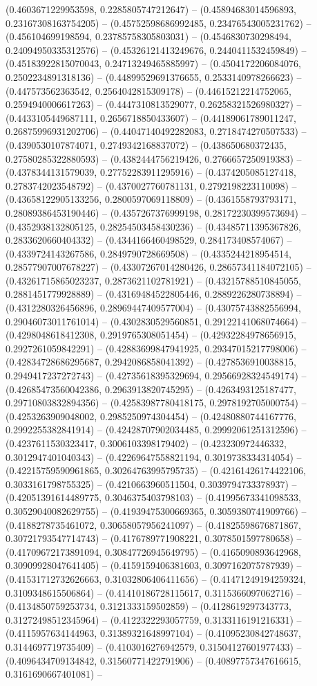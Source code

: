 (0.4603671229953598, 0.2285805747212647) -- (0.45894683014596893, 0.23167308163754205) -- (0.45752598686992485, 0.23476543005231762) -- (0.456104699198594, 0.23785758305803031) -- (0.4546830730298494, 0.24094950335312576) -- (0.45326121413249676, 0.2440411532459849) -- (0.45183922815070043, 0.24713249465885997) -- (0.4504172206084076, 0.2502234891318136) -- (0.44899529691376655, 0.2533140978266623) -- (0.447573562363542, 0.2564042815309178) -- (0.44615212214752065, 0.2594940006617263) -- (0.4447310813529077, 0.26258321526980327) -- (0.4433105449687111, 0.2656718850433607) -- (0.44189061789011247, 0.26875996931202706) -- (0.44047140492282083, 0.2718474270507533) -- (0.4390530107874071, 0.2749342168837072) -- (0.438650680372435, 0.27580285322880593) -- (0.4382444756219426, 0.2766657250919383) -- (0.4378344131579039, 0.27752283911295916) -- (0.4374205085127418, 0.2783742023548792) -- (0.4370027760781131, 0.2792198223110098) -- (0.43658122905133256, 0.2800597069118809) -- (0.4361558793793171, 0.28089386453190446) -- (0.4357267376999198, 0.28172230399573694) -- (0.4352938132805125, 0.28254503458430236) -- (0.43485711395367826, 0.2833620660404332) -- (0.4344166460498529, 0.284173408574067) -- (0.4339724143267586, 0.2849790728669508) -- (0.4335244218954514, 0.28577907007678227) -- (0.43307267014280426, 0.28657341184072105) -- (0.43261715865023237, 0.2873621102781921) -- (0.43215788510845055, 0.2881451779928889) -- (0.43169484522805446, 0.2889226280738894) -- (0.4312280326456896, 0.28969447409577004) -- (0.43075743882556994, 0.29046073011761014) -- (0.4302830529560851, 0.29122141068074664) -- (0.4298048618412308, 0.2919765308051454) -- (0.42932284978656915, 0.2927261059842291) -- (0.42883699847941925, 0.29347015217798006) -- (0.42834728686295687, 0.2942086858041392) -- (0.4278536910038815, 0.2949417237272743) -- (0.42735618395329694, 0.29566928324549174) -- (0.42685473560042386, 0.2963913820745295) -- (0.4263493125187477, 0.29710803832894356) -- (0.42583987780418175, 0.2978192705000754) -- (0.4253263909048002, 0.2985250974304454) -- (0.42480880744167776, 0.2992255382841914) -- (0.42428707902034485, 0.29992061251312596) -- (0.4237611530323417, 0.3006103398179402) -- (0.423230972446332, 0.3012947401040343) -- (0.42269647558821194, 0.3019738334314054) -- (0.42215759590961865, 0.30264763995795735) -- (0.42161426174422106, 0.3033161798755325) -- (0.4210663960511504, 0.3039794733378937) -- (0.42051391614489775, 0.3046375403798103) -- (0.41995673341098533, 0.30529040082629755) -- (0.41939475300669365, 0.3059380741909766) -- (0.4188278735461072, 0.30658057956241097) -- (0.41825598676871867, 0.30721793547714743) -- (0.4176789771908221, 0.3078501597780658) -- (0.41709672173891094, 0.30847726945649795) -- (0.4165090893642968, 0.30909928047641405) -- (0.4159159406381603, 0.3097162075787939) -- (0.41531712732626663, 0.31032806406411656) -- (0.41471249194259324, 0.3109348615506864) -- (0.41410186728115617, 0.3115366097062716) -- (0.4134850759253734, 0.3121333159502859) -- (0.4128619297343773, 0.31272498512345964) -- (0.4122322293057759, 0.3133116191216331) -- (0.4115957634144963, 0.31389321648997104) -- (0.41095230842748637, 0.3144697719735409) -- (0.4103016276942579, 0.31504127601977433) -- (0.4096434709134842, 0.31560771422791906) -- (0.40897757347616615, 0.3161690667401081) -- 